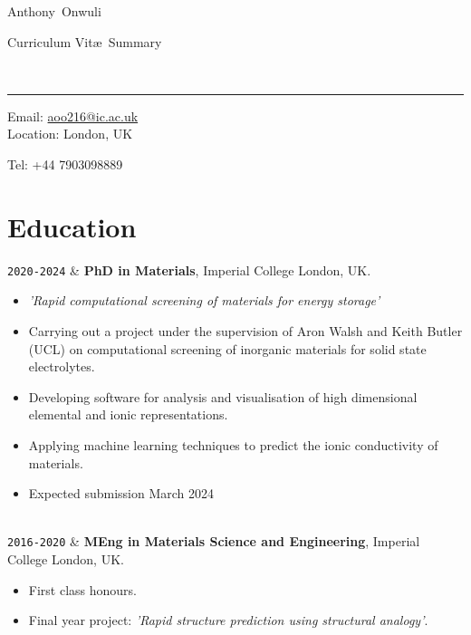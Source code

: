\documentclass[11pt,a4paper]{article}
\makeatletter
\newcommand{\ICL}{Imperial College London}
\newcommand{\Title}{Curriculum Vit\ae\ Summary}
\newcommand{\FirstName}{Anthony}
\newcommand{\LastName}{Onwuli}
\newcommand{\MyName}{\FirstName\ \LastName}
\newcommand{\Email}{aoo216@ic.ac.uk}
\newcommand{\PhoneNumber}{+44 7903098889}
\newcommand{\Duration}[2]{\fontsize{10pt}{0}\selectfont \texttt{#1-#2}}
\makeatother
\begin{document}
\begin{minipage}[t]{0.5\textwidth}
  {\fontsize{20pt}{0}\selectfont\MyName}
\end{minipage}
\begin{minipage}[t]{0.5\textwidth}
  \begin{flushright}
    \Title{}
  \end{flushright}
\end{minipage}
\\[-0.1cm]
\textcolor{lightgray}{\rule{\textwidth}{3pt}}
\begin{minipage}[t]{0.5\textwidth}
  Email: \href{mailto:\Email}{\Email}
  \\
  Location: {London, UK}
\end{minipage}
\begin{minipage}[t]{0.5\textwidth}
  \begin{flushright}
  Tel: \PhoneNumber{}

  \end{flushright}
\end{minipage}
\vspace{-0.3cm}



\section{Education}

\begin{EntriesTableDuration}
  \Duration{2020}{2024}  &
  \textbf{PhD in Materials}, \ICL{}, UK.
  \begin{itemize}
    \item \textit{'Rapid computational screening of materials for energy storage'}
    \item Carrying out a project under the supervision of Aron Walsh and Keith Butler (UCL) on computational screening of inorganic materials for solid state electrolytes.
    \item Developing software for analysis and visualisation of high dimensional elemental and ionic representations.
    \item Applying machine learning techniques to predict the ionic conductivity of materials.
    \item Expected submission March 2024
  \end{itemize}
  \\
  \Duration{2016}{2020}  &
  \textbf{MEng in Materials Science and Engineering}, \ICL{}, UK.
  \begin{itemize}
    \item First class honours.
    \item Final year project: \textit{'Rapid structure prediction using structural analogy'}.
  \end{itemize}
\end{EntriesTableDuration}
\end{document}
